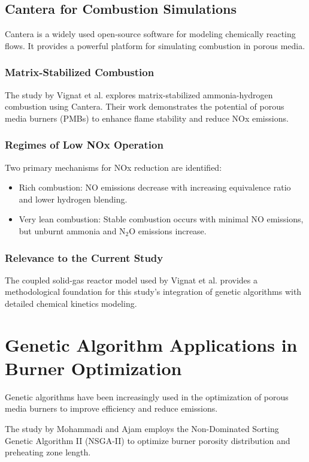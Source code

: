 \documentclass[12pt]{report}
\begin{document}
\subsection{Cantera for Combustion Simulations}
Cantera is a widely used open-source software for modeling chemically reacting flows. It provides a powerful platform for simulating combustion in porous media.

\subsubsection{Matrix-Stabilized Combustion}
The study by Vignat et al. \cite{vignat2023} explores matrix-stabilized ammonia-hydrogen combustion using Cantera. Their work demonstrates the potential of porous media burners (PMBs) to enhance flame stability and reduce NOx emissions.

\subsubsection{Regimes of Low NOx Operation}
Two primary mechanisms for NOx reduction are identified:
\begin{itemize}
    \item Rich combustion: NO emissions decrease with increasing equivalence ratio and lower hydrogen blending.
    \item Very lean combustion: Stable combustion occurs with minimal NO emissions, but unburnt ammonia and N$_2$O emissions increase.
\end{itemize}

\subsubsection{Relevance to the Current Study}
The coupled solid-gas reactor model used by Vignat et al. provides a methodological foundation for this study’s integration of genetic algorithms with detailed chemical kinetics modeling.

\section{Genetic Algorithm Applications in Burner Optimization}

Genetic algorithms have been increasingly used in the optimization of porous media burners to improve efficiency and reduce emissions.

The study by Mohammadi and Ajam \cite{mohammadi2020} employs the Non-Dominated Sorting Genetic Algorithm II (NSGA-II) to optimize burner porosity distribution and preheating zone length.
\end{document}
